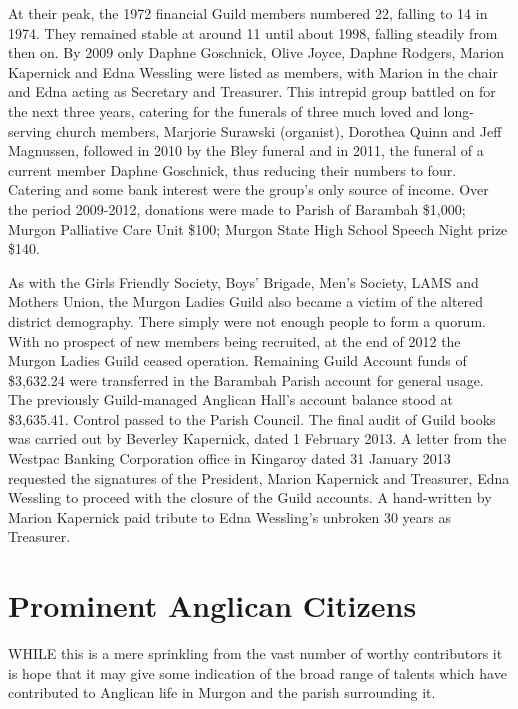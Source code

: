 At their peak, the 1972 financial Guild members numbered 22, falling to 14 in 1974. They remained stable at around 11 until about 1998, falling steadily from then on. By 2009 only Daphne Goschnick, Olive Joyce, Daphne Rodgers, Marion Kapernick and Edna Wessling were listed as members, with Marion in the chair and Edna acting as Secretary and Treasurer. This intrepid group battled on for the next three years, catering for the funerals of three much loved and long-serving church members, Marjorie Surawski (organist), Dorothea Quinn and Jeff Magnussen, followed in 2010 by the Bley funeral and in 2011, the funeral of a current member Daphne Goschnick, thus reducing their numbers to four. Catering and some bank interest were the group's only source of income. Over the period 2009-2012, donations were made to Parish of Barambah \$1,000; Murgon Palliative Care Unit \$100; Murgon State High School Speech Night prize \$140.



As with the Girls Friendly Society, Boys' Brigade, Men's Society, LAMS and Mothers Union, the Murgon Ladies Guild also became a victim of the altered district demography. There simply were not enough people to form a quorum. With no prospect of new members being recruited, at the end of 2012 the Murgon Ladies Guild ceased operation. Remaining Guild Account funds of \$3,632.24 were transferred in the Barambah Parish account for general usage. The previously Guild-managed Anglican Hall's account balance stood at \$3,635.41. Control passed to the Parish Council. The final audit of Guild books was carried out by Beverley Kapernick, dated 1 February 2013. A letter from the Westpac Banking Corporation office in Kingaroy dated 31 January 2013 requested the signatures of the President, Marion Kapernick and Treasurer, Edna Wessling to proceed with the closure of the Guild accounts. A hand-written by Marion Kapernick paid tribute to Edna Wessling's unbroken 30 years as Treasurer.

\balance


\printendnotes[custom]
\setcounter{endnote}{0}
\chapter{Prominent Anglican Citizens}
\nobalance


\lettrine[lines=3]{W}{HILE}
 this is a mere sprinkling from the vast number of worthy contributors it is hope that it may give some indication of the broad range of talents which have contributed to Anglican life in Murgon and the parish surrounding it.

